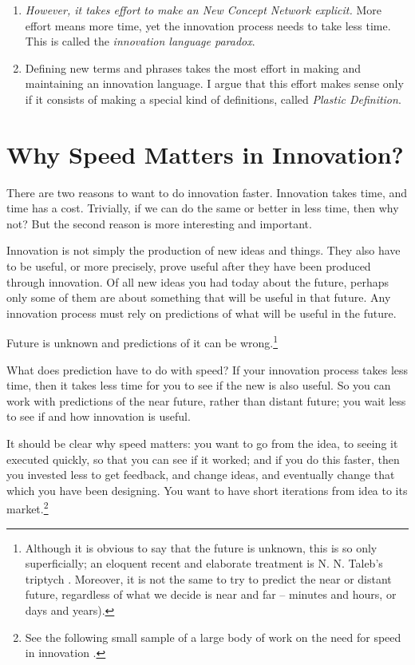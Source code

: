 \documentclass[graybox,envcountchap,sectrefs]{svmono}
\newcommand{\ncnf}{New Concept Network}
\newcommand{\newdef}[1]{Plastic Definition}
\begin{document}
\begin{enumerate}
	\item \textit{However, it takes effort to make an \ncnf{} explicit.} More effort means more time, yet the innovation process needs to take less time. This is called the \textit{innovation language paradox}.
	\item Defining new terms and phrases takes the most effort in making and maintaining an innovation language. I argue that this effort makes sense only if it consists of making a special kind of definitions, called \textit{\newdef s}.
\end{enumerate}

\section{Why Speed Matters in Innovation?}
\label{c2:s4}
There are two reasons to want to do innovation faster. Innovation takes time, and time has a cost. Trivially, if we can do the same or better in less time, then why not? But the second reason is more interesting and important. 

Innovation is not simply the production of new ideas and things. They also have to be useful, or more precisely, prove useful after they have been produced through innovation. Of all new ideas you had today about the future, perhaps only some of them are about something that will be useful in that future. Any innovation process must rely on predictions of what will be useful in the future. 

Future is unknown and predictions of it can be wrong.\footnote{Although it is obvious to say that the future is unknown, this is so only superficially; an eloquent recent and elaborate treatment is N. N. Taleb's triptych \cite{taleb2005fooled1,taleb2007black1,taleb2012antifragile1}. Moreover, it is not the same to try to predict the near or distant future, regardless of what we decide is near and far -- minutes and hours, or days and years).}

What does prediction have to do with speed? If your innovation process takes less time, then it takes less time for you to see if the new is also useful. So you can work with predictions of the near future, rather than distant future; you wait less to see if and how innovation is useful.

It should be clear why speed matters: you want to go from the idea, to seeing it executed quickly, so that you can see if it worked; and if you do this faster, then you invested less to get feedback, and change ideas, and eventually change that which you have been designing. You want to have short iterations from idea to its market.\footnote{See the following small sample of a large body of work on the need for speed in innovation \cite{teece1992,teece1997,von2005democratizing,christensen2013innovator,ries2011leanstartup,christensen2016}.}
\end{document}
